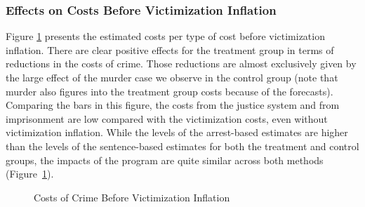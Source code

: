 \subsubsection{Effects on Costs Before Victimization Inflation}  Figure \ref{tab:diff-costs} presents the estimated costs per type of cost before victimization inflation.
\noindent There are clear positive effects for the treatment group in terms of reductions in the costs of crime. Those reductions are almost exclusively given by the large effect of the murder case we observe in the control group (note that murder also figures into the treatment group costs because of the forecasts). Comparing the bars in this figure, the costs from the justice system and from imprisonment are low compared with the victimization costs, even without victimization inflation. While the levels of the arrest-based estimates are higher than the levels of the sentence-based estimates for both the treatment and control groups, the impacts of the program are quite similar across both methods (Figure~\ref{tab:diff-costs}).

\begin{figure} [H]
\caption{Costs of Crime Before Victimization Inflation}
\centering  \label{tab:diff-costs}
{}
\end{figure}

